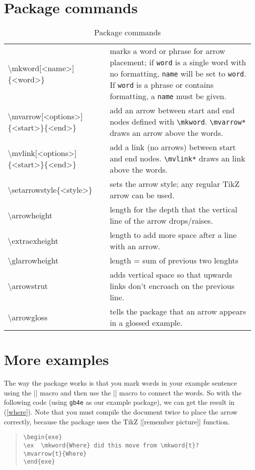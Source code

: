 \documentclass[11pt]{article}
\newcommand*{\pkg}[1]{\texttt{#1}}
\newcommand*{\bs}{\textbackslash}
\begin{document}
\section{Package commands}
\begin{table}[htpb]
\centering
\begin{tabularx}{\textwidth}{t{l}X}
\toprule
\bs mkword[<name>]\{<word>\} & marks a word or phrase for arrow placement; if \pkg{word} is a single word with no formatting, \pkg{name} will be set to \pkg{word}. If \pkg{word} is a phrase or contains formatting, a \pkg{name} must be given.\\
\bs mvarrow[<options>]\{<start>\}\{<end>\} & add an arrow between start and end nodes defined with \pkg{\bs mkword}. \pkg{\bs mvarrow*} draws an arrow above the words.\\
\bs mvlink[<options>]\{<start>\}\{<end>\} & add a link (no arrows) between start and end nodes. \pkg{\bs mvlink*} draws an link above the words. \\
\bs setarrowstyle\{<style>\} & sets the arrow style; any regular TikZ arrow can be used.\\
\bs arrowheight & length for the depth that the vertical line of the arrow drops/raises.\\
\bs extraexheight & length to add more space after a line with an arrow.\\
\bs glarrowheight & length = sum of previous two lenghts\\
\bs arrowstrut & adds vertical space so that upwards links don't encroach on the previous line.\\
\bs arrowgloss & tells the package that an arrow appears in a glossed example.\\
\bottomrule
\end{tabularx}
\caption{Package commands}
\end{table}
\section{More examples}
The way the package works is that you mark words in your example sentence using the |\mkword| macro and then use the |\mvarrow| macro to connect the words. So with the following code (using \pkg{gb4e} as our example package), we can get the result in (\ref{where}).  Note that you must compile the document twice to place the arrow correctly, because the package uses the TikZ |[remember picture]| function.


\begin{quote}
\begin{lstlisting}
\begin{exe}
\ex  \mkword{Where} did this move from \mkword{t}?
\mvarrow{t}{Where}
\end{exe}
\end{lstlisting}
\end{quote}
\end{document}
